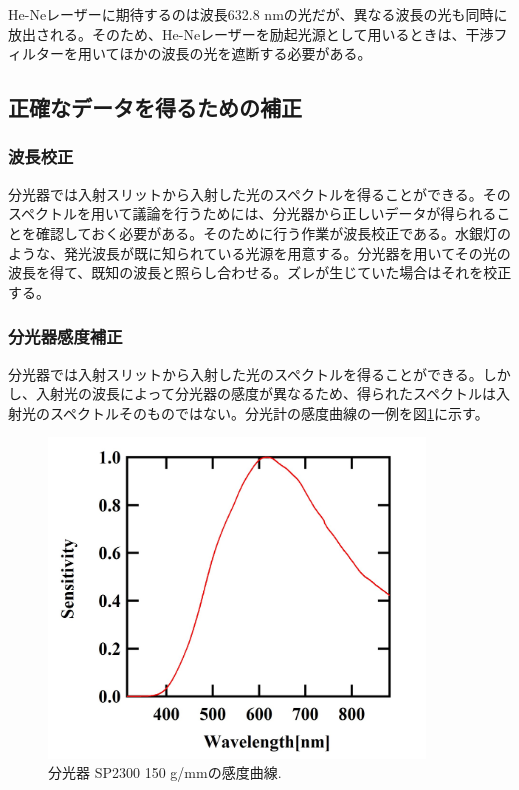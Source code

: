 \documentclass[11pt,a4j]{jsarticle}
\begin{document}
He-Neレーザーに期待するのは波長632.8 nmの光だが、異なる波長の光も同時に放出される。そのため、He-Neレーザーを励起光源として用いるときは、干渉フィルターを用いてほかの波長の光を遮断する必要がある。

\newpage
\subsection{正確なデータを得るための補正}
\subsubsection{波長校正}

分光器では入射スリットから入射した光のスペクトルを得ることができる。そのスペクトルを用いて議論を行うためには、分光器から正しいデータが得られることを確認しておく必要がある。そのために行う作業が波長校正である。水銀灯のような、発光波長が既に知られている光源を用意する。分光器を用いてその光の波長を得て、既知の波長と照らし合わせる。ズレが生じていた場合はそれを校正する。

\subsubsection{分光器感度補正}
分光器では入射スリットから入射した光のスペクトルを得ることができる。しかし、入射光の波長によって分光器の感度が異なるため、得られたスペクトルは入射光のスペクトルそのものではない。分光計の感度曲線の一例を図\ref{fig_sensitivity1}に示す。

\begin{figure}[h]
 \centering
 \includegraphics[clip,width=10cm]{start_sensitivity.jpg}
 \caption{分光器 SP2300 150 g/mmの感度曲線.}
 \label{fig_sensitivity1}
\end{figure}
\end{document}
